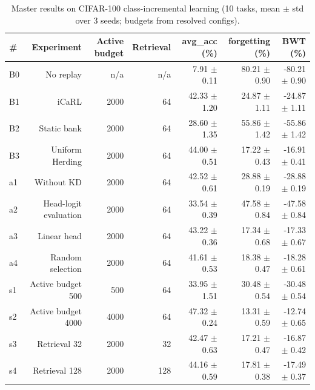\documentclass{article}
\begin{document}
\begin{table}[htbp]
  \centering
  \caption{Master results on CIFAR-100 class-incremental learning (10 tasks, mean $\pm$ std over 3 seeds; budgets from resolved configs).}
  \label{tab:T1_master_results}
  \begin{tabular}{lrrrrrr}
    \toprule
    \textbf{\#} & \textbf{Experiment} & \textbf{Active budget} & \textbf{Retrieval} & \textbf{avg\_acc (\%)} & \textbf{forgetting (\%)} & \textbf{BWT (\%)} \\
    \midrule
    B0 & No replay & n/a & n/a & 7.91 $\pm$ 0.11 & 80.21 $\pm$ 0.90 & -80.21 $\pm$ 0.90 \\
    B1 & iCaRL & 2000 & 64 & 42.33 $\pm$ 1.20 & 24.87 $\pm$ 1.11 & -24.87 $\pm$ 1.11 \\
    B2 & Static bank & 2000 & 64 & 28.60 $\pm$ 1.35 & 55.86 $\pm$ 1.42 & -55.86 $\pm$ 1.42 \\
    B3 & Uniform Herding & 2000 & 64 & 44.00 $\pm$ 0.51 & 17.22 $\pm$ 0.43 & -16.91 $\pm$ 0.41 \\
    a1 & Without KD & 2000 & 64 & 42.52 $\pm$ 0.61 & 28.88 $\pm$ 0.19 & -28.88 $\pm$ 0.19 \\
    a2 & Head-logit evaluation & 2000 & 64 & 33.54 $\pm$ 0.39 & 47.58 $\pm$ 0.84 & -47.58 $\pm$ 0.84 \\
    a3 & Linear head & 2000 & 64 & 43.22 $\pm$ 0.36 & 17.34 $\pm$ 0.68 & -17.33 $\pm$ 0.67 \\
    a4 & Random selection & 2000 & 64 & 41.61 $\pm$ 0.53 & 18.38 $\pm$ 0.47 & -18.28 $\pm$ 0.61 \\
    s1 & Active budget 500 & 500 & 64 & 33.95 $\pm$ 1.51 & 30.48 $\pm$ 0.54 & -30.48 $\pm$ 0.54 \\
    s2 & Active budget 4000 & 4000 & 64 & 47.32 $\pm$ 0.24 & 13.31 $\pm$ 0.59 & -12.74 $\pm$ 0.65 \\
    s3 & Retrieval 32 & 2000 & 32 & 42.47 $\pm$ 0.63 & 17.21 $\pm$ 0.47 & -16.87 $\pm$ 0.42 \\
    s4 & Retrieval 128 & 2000 & 128 & 44.16 $\pm$ 0.59 & 17.81 $\pm$ 0.38 & -17.49 $\pm$ 0.37 \\
    \bottomrule
  \end{tabular}
\end{table}
\end{document}

